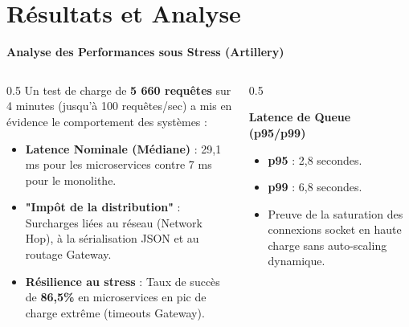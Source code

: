 \documentclass[10pt,aspectratio=169]{beamer}
\begin{document}
\section{Résultats et Analyse}

\begin{frame}{\textbf{Analyse des Performances sous Stress (Artillery)}}
    \begin{columns}
        \begin{column}{0.5\textwidth}
            Un test de charge de \textbf{5 660 requêtes} sur 4 minutes (jusqu'à 100 requêtes/sec) a mis en évidence le comportement des systèmes :
            \begin{itemize}
                \item \textbf{Latence Nominale (Médiane)} : 29,1 ms pour les microservices contre 7 ms pour le monolithe.
                \item \textbf{"Impôt de la distribution"} : Surcharges liées au réseau (Network Hop), à la sérialisation JSON et au routage Gateway.
                \item \textbf{Résilience au stress} : Taux de succès de \textbf{86,5\%} en microservices en pic de charge extrême (timeouts Gateway).
            \end{itemize}
        \end{column}
        \begin{column}{0.5\textwidth}
            \begin{block}{\textbf{Latence de Queue (p95/p99)}}
                \begin{itemize}
                    \item \textbf{p95} : 2,8 secondes.
                    \item \textbf{p99} : 6,8 secondes.
                    \item Preuve de la saturation des connexions socket en haute charge sans auto-scaling dynamique.
                \end{itemize}
            \end{block}
        \end{column}
    \end{columns}
\end{frame}
\end{document}
